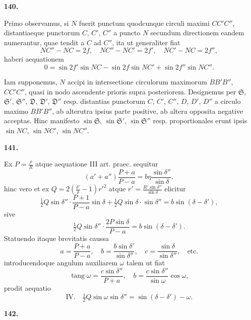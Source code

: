 \documentclass[12pt,a4paper]{article}
\DeclareMathOperator{\tang}{tang}
\begin{document}
\bigskip
\noindent\textbf{140.}

Primo observamus, si $N$ fuerit punctum quodcunque circuli maximi $CC'C''$,
distantiaeque punctorum $C$, $C'$, $C''$ a puncto $N$ secundum directionem eandem
numerantur, quae tendit a $C$ ad $C''$, ita ut generaliter fiat
\[
NC'' - NC = 2f, \quad NC'' - NC' = 2f', \quad NC' - NC = 2f'',
\]
haberi aequationem
\[
0 = \sin 2f' \sin NC - \sin 2f \sin NC' + \sin 2f'' \sin NC''.
\]

Iam supponemus, $N$ accipi in intersectione circulorum maximorum $BB'B''$,
$CC'C''$, quasi in nodo ascendente prioris supra posteriorem. Designemus per
$\mathfrak{S}$, $\mathfrak{S}'$, $\mathfrak{S}''$, $\mathfrak{D}$, $\mathfrak{D}'$, $\mathfrak{D}''$ resp. distantias punctorum $C$, $C'$, $C''$, $D$, $D'$, $D''$ a circulo
maximo $BB'B''$, ab alterutra ipsius parte positive, ab altera opposita negative
acceptas. Hinc manifesto $\sin\mathfrak{S}$, $\sin\mathfrak{S}'$, $\sin\mathfrak{S}''$ resp. proportionales erunt ipsis
$\sin NC$, $\sin NC'$, $\sin NC''$.

\bigskip
\noindent\textbf{141.}

Ex $P = \frac{\rho}{R}$ atque aequatione III art. praec. sequitur
\[
(a' + a'')\frac{P + a}{P - a} = b\eta\frac{\sin\delta''}{\sin\delta},
\]
hinc vero et ex $Q = 2(\frac{\delta'}{\delta} - 1)r'^2$ atque $r' = \frac{R'\sin\delta''}{\sin\delta}$ elicitur
\[
\tfrac{1}{2}Q\sin\delta'' \cdot \frac{P + 1}{P - a}\sin\delta + \tfrac{1}{2}Q\sin\delta \cdot \sin\delta'' = b\sin(\delta - \delta'),
\]
sive
\[
\tfrac{1}{2}Q\sin\delta'' \cdot \frac{2P\sin\delta}{P - a} = b\sin(\delta - \delta').
\]
Statuendo itaque brevitatis caussa
\begin{equation}
a = \frac{P + a}{P - a}, \quad b = \frac{b\sin\delta'}{\sin\delta''}, \quad c = \frac{\sin\delta}{\sin\delta''}, \quad \text{etc.} \tag{14}
\end{equation}
introducendoque angulum auxiliarem $\omega$ talem ut fiat
\[
\tang\omega = \frac{c\sin\delta''}{P + a}, \quad b = \frac{c\sin\delta''}{\sin\omega}\cos\omega,
\]
prodit aequatio
\begin{equation}
\text{IV.} \quad \tfrac{1}{2}Q\sin\omega\sin\delta'' = \sin(\delta - \delta') - \omega. \tag{IV}
\end{equation}

\bigskip
\noindent\textbf{142.}
\end{document}
